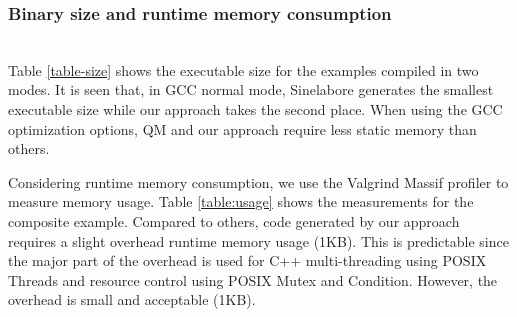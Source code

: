 \subsubsection{Binary size and runtime memory consumption} ~\\
\noindent
Table \ref{table-size} shows the executable size for the examples compiled in two modes.
It is seen that, in GCC normal mode, Sinelabore generates the smallest executable size while our approach takes the second place.
When using the GCC optimization options, QM and our approach require less static memory than others. 

Considering runtime memory consumption, we use the Valgrind Massif profiler\cite{Massif} to measure memory usage. 
Table \ref{table:usage} shows the measurements for the composite example. 
Compared to others, code generated by our approach requires a slight overhead runtime memory usage (1KB).
This is predictable since the major part of the overhead is used for C++ multi-threading using POSIX Threads and resource control using POSIX Mutex and Condition. 
However, the overhead is small and acceptable (1KB). 

